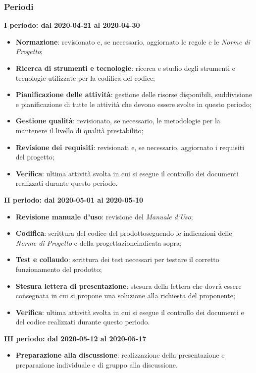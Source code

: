 \subsubsection{Periodi}
\textbf{I periodo: dal 2020-04-21 al 2020-04-30}
\begin{itemize}
	\item \textbf{Normazione}: revisionato e, se necessario, aggiornato le regole e le \textit{Norme di Progetto};
	\item \textbf{Ricerca di strumenti e tecnologie}: ricerca e studio degli strumenti e tecnologie utilizzate per la codifica del codice;
	\item \textbf{Pianificazione delle attività}: gestione delle risorse disponibili, suddivisione e pianificazione di tutte le attività che devono essere svolte in questo periodo;
	\item \textbf{Gestione qualità}: revisionato, se necessario, le metodologie per la mantenere il livello di qualità prestabilito;
	\item \textbf{Revisione dei requisiti}: revisionati e, se necessario, aggiornato i requisiti del progetto\glo;
	\item \textbf{Verifica}: ultima attività svolta in cui si esegue il controllo dei documenti realizzati durante questo periodo.
\end{itemize}

\textbf{II periodo: dal 2020-05-01 al 2020-05-10}
\begin{itemize}
	\item \textbf{Revisione manuale d'uso}: revisione del \textit{Manuale d'Uso};
	\item \textbf{Codifica}: scrittura del codice del prodotto\glosp seguendo le indicazioni delle \textit{Norme di Progetto} e della progettazione\glosp indicata sopra;
	\item \textbf{Test e collaudo}: scrittura dei test necessari per testare il corretto funzionamento del prodotto\glo;
	\item \textbf{Stesura lettera di presentazione}: stesura della lettera che dovrà essere consegnata in cui si propone una soluzione alla richiesta del proponente;
	\item \textbf{Verifica}: ultima attività svolta in cui si esegue il controllo dei documenti e del codice realizzati durante questo periodo.
\end{itemize}

\textbf{III periodo: dal 2020-05-12 al 2020-05-17}
\begin{itemize}
	\item \textbf{Preparazione alla discussione}: realizzazione della presentazione e preparazione individuale e di gruppo alla discussione.
\end{itemize}